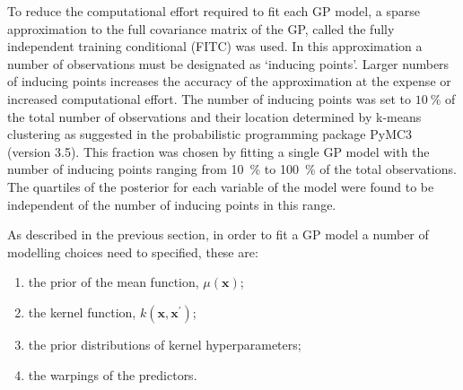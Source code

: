 To reduce the computational effort required to fit each GP model, a sparse approximation to the full covariance matrix of the GP, called the fully independent training conditional (FITC) was used\cite{quinonero-candelaUnifyingViewSparse2005}. In this approximation a number of observations must be designated as `inducing points'. Larger numbers of inducing points increases the accuracy of the approximation at the expense or increased computational effort. The number of inducing points was set to $\SI{10}{\percent}$ of the total number of observations and their location determined by k-means clustering as suggested in the probabilistic programming package PyMC3 (version 3.5)\cite{salvatierProbabilisticProgrammingPython2016}. This fraction was chosen by fitting a single GP model with the number of inducing points ranging from \SI{10}{\percent} to \SI{100}{\percent} of the total observations. The quartiles of the posterior for each variable of the model were found to be independent of the number of inducing points in this range.  

As described in the previous section, in order to fit a GP model a number of modelling choices need to specified, these are: 
\begin{enumerate}
    \item the prior of the mean function, $\mu(\mathbf{x})$;
    \item the kernel function, $k(\mathbf{x}, \mathbf{x}^{\prime})$;
    \item the prior distributions of kernel hyperparameters;
    \item the warpings of the predictors.
\end{enumerate}

